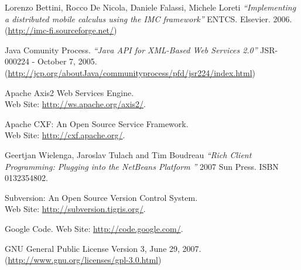 \begin{thebibliography}{99}
 Lorenzo Bettini, Rocco De Nicola, Daniele Falassi, Michele Loreti
\emph{``Implementing a distributed mobile calculus using the IMC framework''}
ENTCS. Elsevier. 2006.\\
(\href{http://imc-fi.sourceforge.net/}{http://imc-fi.sourceforge.net/})

 Java Comunity Process. \emph{``Java API for XML-Based Web
Services 2.0''} JSR-000224 - October 7, 2005.\\
(\href{http://jcp.org/aboutJava/communityprocess/pfd/jsr224/index.html}{http://jcp.org/aboutJava/communityprocess/pfd/jsr224/index.html})

 Apache Axis2 Web Services Engine. \\
Web Site: \href{http://ws.apache.org/axis2/}{http://ws.apache.org/axis2/}.

 Apache CXF: An Open Source Service Framework. \\
Web Site: \href{http://cxf.apache.org/}{http://cxf.apache.org/}.

 Geertjan Wielenga, Jaroslav Tulach and Tim Boudreau
\emph{``Rich Client Programming: Plugging into the NetBeans Platform ''} 2007
Sun Press. ISBN 0132354802.

 Subversion: An Open Source Version Control System. \\
Web Site: \href{http://subversion.tigris.org/}{http://subversion.tigris.org/}.

 Google Code. Web
Site: \href{http://code.google.com/}{http://code.google.com/}.

 GNU General Public License Version 3, June 29, 2007. \\ 
(\href{http://www.gnu.org/licenses/gpl-3.0.html}{http://www.gnu.org/licenses/gpl-3.0.html})

\end{thebibliography} 
